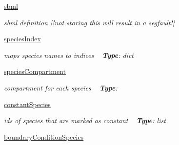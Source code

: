 \begin{DoxyCompactItemize}
\mbox{\hyperlink{classamici_1_1sbml__import_1_1_sbml_importer_ac1e9dd522f751032fb0142ef8a78c3f4}{sbml}}
\begin{DoxyCompactList}\small\item\em sbml definition \mbox{[}!not storing this will result in a segfault!\mbox{]} \end{DoxyCompactList}\item 
\mbox{\label{classamici_1_1sbml__import_1_1_sbml_importer_a88d39dffecd3ff40fea335bc82fdee06}} 
\mbox{\hyperlink{classamici_1_1sbml__import_1_1_sbml_importer_a88d39dffecd3ff40fea335bc82fdee06}{species\+Index}}
\begin{DoxyCompactList}\small\item\em maps species names to indices ~\newline
{\bfseries Type}\+: dict \end{DoxyCompactList}\item 
\mbox{\label{classamici_1_1sbml__import_1_1_sbml_importer_aeebf394715386e2d46b381aec705e7cd}} 
\mbox{\hyperlink{classamici_1_1sbml__import_1_1_sbml_importer_aeebf394715386e2d46b381aec705e7cd}{species\+Compartment}}
\begin{DoxyCompactList}\small\item\em compartment for each species ~\newline
{\bfseries Type}\+: \end{DoxyCompactList}\item 
\mbox{\label{classamici_1_1sbml__import_1_1_sbml_importer_a64859da7ab190d44c8d03e004e5712fc}} 
\mbox{\hyperlink{classamici_1_1sbml__import_1_1_sbml_importer_a64859da7ab190d44c8d03e004e5712fc}{constant\+Species}}
\begin{DoxyCompactList}\small\item\em ids of species that are marked as constant ~\newline
{\bfseries Type}\+: list \end{DoxyCompactList}\item 
\mbox{\label{classamici_1_1sbml__import_1_1_sbml_importer_ac58d33fa62dff054a1f5b77f62b90d51}} 
\mbox{\hyperlink{classamici_1_1sbml__import_1_1_sbml_importer_ac58d33fa62dff054a1f5b77f62b90d51}{boundary\+Condition\+Species}}

\end{DoxyCompactItemize}
